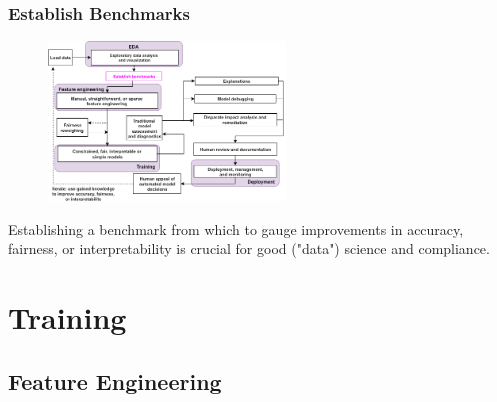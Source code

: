 \documentclass[11pt,
               aspectratio=169,
               hyperref={colorlinks}
               ]{beamer}
\begin{document}
		\begin{frame}
		
			\frametitle{Establish Benchmarks}		

			\begin{figure}[htb]
				\begin{center}
					\includegraphics[height=120pt]{img/bench.png}
					\label{fig:blueprint}
				\end{center}
			\end{figure}	

			\centering
			\vspace{-10pt}
			Establishing a benchmark from which to gauge improvements in accuracy, fairness, or interpretability is crucial for good ("data") science and compliance. 
		
		\end{frame}


	\section{Training}

		\subsection{Feature Engineering}
\end{document}
